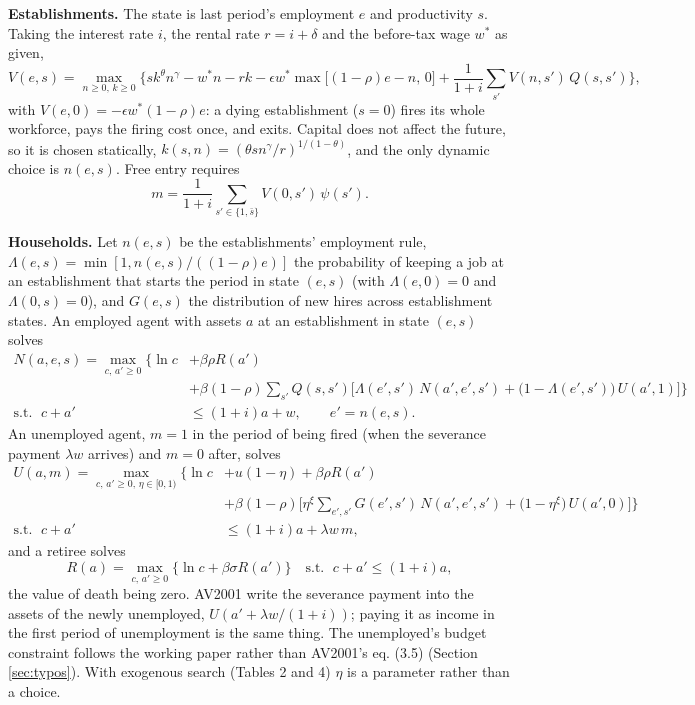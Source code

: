 \documentclass[11pt,fleqn]{article}
\begin{document}
\textbf{Establishments.} The state is last period's employment $e$ and productivity $s$. Taking the interest rate $i$, the rental rate $r=i+\delta$ and the before-tax wage $w^*$ as given,
\begin{equation*}
V(e,s) = \max_{n\geq 0,\,k\geq 0} \Big\{ s k^\theta n^\gamma - w^* n - r k - \epsilon w^* \max\big[(1-\rho)e-n,\,0\big] + \frac{1}{1+i}\sum_{s'} V(n,s')\,Q(s,s') \Big\},
\end{equation*}
with $V(e,0)=-\epsilon w^*(1-\rho)e$: a dying establishment ($s=0$) fires its whole workforce, pays the firing cost once, and exits. Capital does not affect the future, so it is chosen statically, $k(s,n)=(\theta s n^\gamma/r)^{1/(1-\theta)}$, and the only dynamic choice is $n(e,s)$. Free entry requires
\begin{equation*}
m = \frac{1}{1+i}\sum_{s'\in\{1,\bar{s}\}} V(0,s')\,\psi(s').
\end{equation*}

\textbf{Households.} Let $n(e,s)$ be the establishments' employment rule, $\Lambda(e,s)=\min[1,n(e,s)/((1-\rho)e)]$ the probability of keeping a job at an establishment that starts the period in state $(e,s)$ (with $\Lambda(e,0)=0$ and $\Lambda(0,s)=0$), and $G(e,s)$ the distribution of new hires across establishment states. An employed agent with assets $a$ at an establishment in state $(e,s)$ solves
\begin{align*}
N(a,e,s) = \max_{c,\,a'\geq 0} \Big\{ \ln c &+ \beta\rho R(a') \\
&+ \beta(1-\rho)\sum_{s'} Q(s,s') \Big[ \Lambda(e',s')\,N(a',e',s') + \big(1-\Lambda(e',s')\big)\,U(a',1) \Big] \Big\} \\
\text{s.t. } \; c+a' &\leq (1+i)a + w, \qquad e'=n(e,s).
\end{align*}
An unemployed agent, $m=1$ in the period of being fired (when the severance payment $\lambda w$ arrives) and $m=0$ after, solves
\begin{align*}
U(a,m) = \max_{c,\,a'\geq 0,\,\eta\in[0,1)} \Big\{ \ln c &+ u(1-\eta) + \beta\rho R(a') \\
&+ \beta(1-\rho)\Big[ \eta^\xi \sum_{e',s'} G(e',s')\,N(a',e',s') + \big(1-\eta^\xi\big)\,U(a',0) \Big] \Big\} \\
\text{s.t. } \; c+a' &\leq (1+i)a + \lambda w\, m,
\end{align*}
and a retiree solves
\begin{equation*}
R(a) = \max_{c,\,a'\geq 0} \big\{ \ln c + \beta\sigma R(a') \big\} \quad \text{s.t. } \; c+a' \leq (1+i)a,
\end{equation*}
the value of death being zero. AV2001 write the severance payment into the assets of the newly unemployed, $U(a'+\lambda w/(1+i))$; paying it as income in the first period of unemployment is the same thing. The unemployed's budget constraint follows the working paper rather than AV2001's eq. (3.5) (Section \ref{sec:typos}). With exogenous search (Tables 2 and 4) $\eta$ is a parameter rather than a choice.
\end{document}
